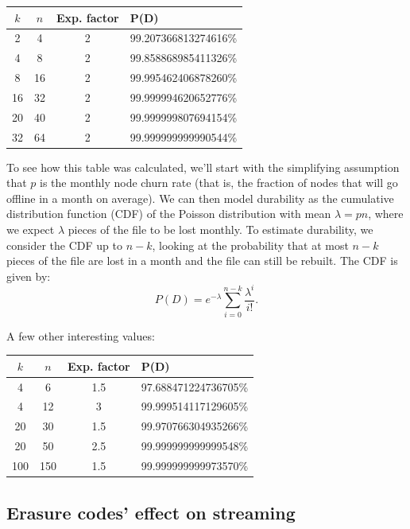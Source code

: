 \documentclass[11pt,fleqn,openany]{book}
\begin{document}
\begin{center}
\begin{tabular}{c c c l}
$k$ & $n$ & Exp. factor & P(D) \\ \hline
2 & 4 & 2 & 99.207366813274616\%\\
4 & 8 & 2 & 99.858868985411326\%\\
8 & 16 & 2 & 99.995462406878260\%\\
16 & 32 & 2 & 99.999994620652776\%\\
20 & 40 & 2 & 99.999999807694154\%\\
32 & 64 & 2 & 99.999999999990544\%\\
\end{tabular}
\end{center}

To see how this table was calculated, we'll start
with the simplifying assumption that $p$ is the monthly node
churn rate (that is, the fraction of nodes that will go offline in a month on
average). We can then model durability
as the cumulative distribution function (CDF) of the Poisson distribution with mean $\lambda=pn$,
where we expect $\lambda$ pieces of the file to be lost monthly. To estimate
durability, we consider the CDF up to $n-k$,
looking at the probability that at most $n-k$ pieces
of the file are lost in a month and the file can still be rebuilt.
The CDF is given by:
\begin{equation}
P(D) = e^{-\lambda} \sum_{i=0}^{n-k} \frac{\lambda^i}{i!}.
\label{eq:poiss_cdf}
\end{equation}

A few other interesting values:

\begin{center}
\begin{tabular}{c c c l}
$k$ & $n$ & Exp. factor & P(D) \\ \hline
4 & 6 & 1.5 & 97.688471224736705\%\\
4 & 12 & 3 & 99.999514117129605\%\\
20 & 30 & 1.5 & 99.970766304935266\%\\
20 & 50 & 2.5 & 99.999999999999548\%\\
100 & 150 & 1.5 & 99.999999999973570\%\\
\end{tabular}
\end{center}

\subsection{Erasure codes' effect on streaming}
\end{document}
